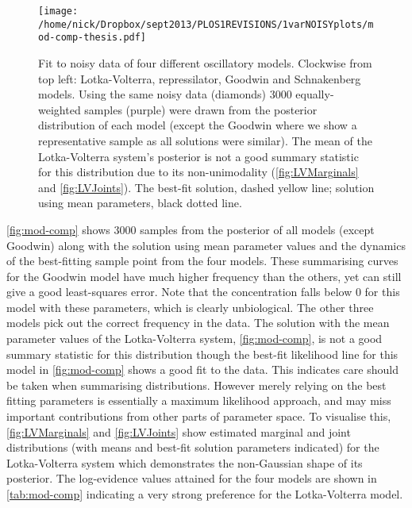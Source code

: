 \begin{figure*}[!htbp]
    \texttt{[image: /home/nick/Dropbox/sept2013/PLOS1REVISIONS/1varNOISYplots/mod-comp-thesis.pdf]}
  \caption{Fit to noisy data of four different oscillatory models.
    Clockwise from top left: Lotka-Volterra, repressilator, Goodwin and Schnakenberg models.
    Using the same noisy data (diamonds) 3000 equally-weighted samples (purple) were drawn from the posterior distribution of each model (except the Goodwin where we show a representative sample as all solutions were similar).
    The mean of the Lotka-Volterra system's posterior is not a good summary statistic for this distribution due to its non-unimodality (\autoref{fig:LVMarginals} and \autoref{fig:LVJoints}).
    The best-fit solution, dashed yellow line; solution using mean parameters, black dotted line.
  }
  \label{fig:mod-comp}
\end{figure*}

\autoref{fig:mod-comp} shows 3000 samples from the posterior of all models (except Goodwin) along with the solution using mean parameter values and the dynamics of the best-fitting sample point from the four models.
These summarising curves for the Goodwin model have much higher frequency than the others, yet can still give a good least-squares error.
Note that the concentration falls below 0 for this model with these parameters, which is clearly unbiological. 
The other three models pick out the correct frequency in the data. 
The solution with the mean parameter values of the Lotka-Volterra system, \autoref{fig:mod-comp}, is not a good summary statistic for this distribution though the best-fit likelihood line for this model in \autoref{fig:mod-comp} shows a good fit to the data.
This indicates care should be taken when summarising distributions.
However merely relying on the best fitting parameters is essentially a maximum likelihood approach, and may miss important contributions from other parts of parameter space. 
To visualise this, \autoref{fig:LVMarginals} and \autoref{fig:LVJoints} show estimated marginal and joint distributions (with means and best-fit solution parameters indicated) for the Lotka-Volterra system which demonstrates the non-Gaussian shape of its posterior. 
The log-evidence values attained for the four models are shown in \autoref{tab:mod-comp} indicating a very strong preference for the Lotka-Volterra model.

